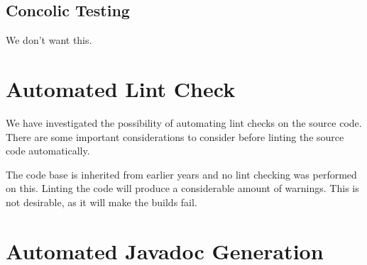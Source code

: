 \subsection{Concolic Testing}
We don't want this.

\section{Automated Lint Check}
We have investigated the possibility of automating lint checks on the source code. There are some important considerations to consider before linting the source code automatically.


The code base is inherited from earlier years and no lint checking was performed on this. Linting the code will produce a considerable amount of warnings. This is not desirable, as it will make the builds fail.



\section{Automated Javadoc Generation}
